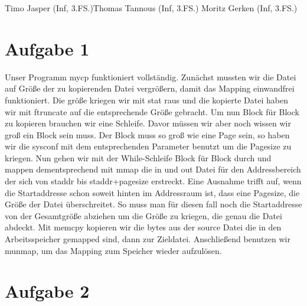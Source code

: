 \documentclass{ti2}
\begin{document}
\lstset{linewidth=\linewidth,breaklines=true}
%
                {Timo Jasper (Inf, 3.FS.)}{Thomas Tannous (Inf, 3.FS.)}%
                {Moritz Gerken (Inf, 3.FS.)}%

\section*{Aufgabe 1}
Unser Programm mycp funktioniert vollständig.
Zunächst mussten wir die Datei auf Größe der zu kopierenden Datei vergrößern, 
damit das Mapping einwandfrei funktioniert. Die größe kriegen wir mit stat raus und
die kopierte Datei haben wir mit ftruncate auf die entsprechende Größe gebracht.
Um nun Block für Block zu kopieren brauchen wir eine Schleife. Davor müssen wir aber noch
wissen wir groß ein Block sein muss. Der Block muss so groß wie eine Page sein, so haben wir 
die sysconf mit dem entsprechenden Parameter benutzt um die Pagesize zu kriegen.
Nun gehen wir mit der While-Schleife Block für Block durch und mappen dementsprechend mit mmap
die in und out Datei für den Addressbereich der sich von staddr bis staddr+pagesize erstreckt.
Eine Ausnahme trifft auf, wenn die Startaddresse schon soweit hinten im Addressraum ist, dass eine Pagesize, die Größe der Datei überschreitet. So muss man für diesen fall noch die Startaddresse von der Gesamtgröße abziehen um die Größe zu kriegen, die genau die Datei abdeckt.
Mit memcpy kopieren wir die bytes aus der source Datei die in den Arbeitsspeicher gemapped sind, dann zur Zieldatei. Anschließend benutzen wir munmap, um das Mapping zum Speicher wieder aufzulösen. 

\section*{Aufgabe 2}


\end{document}
